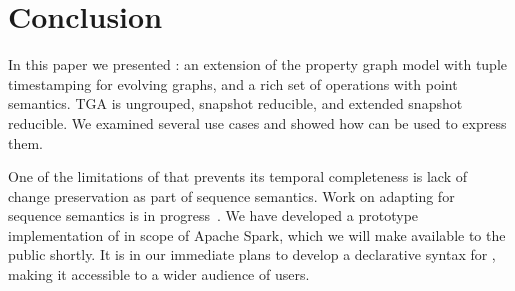 \section{Conclusion}
\label{sec:conc}

In this paper we presented \tga: an extension of the property graph
model with tuple timestamping for evolving graphs, and a rich set of
operations with point semantics.  TGA is ungrouped, snapshot
reducible, and extended snapshot reducible.  We examined several use
cases and showed how \tga can be used to express them.


One of the limitations of \tga that prevents its temporal completeness
is lack of change preservation as part of sequence semantics.  Work on
adapting \tga for sequence semantics is in
progress~\cite{MoffittEDBT17}.
%
We have developed a prototype implementation of \tga in scope of
Apache Spark, which we will make available to the public shortly.  It
is in our immediate plans to develop a declarative syntax for \tga,
making it accessible to a wider audience of users.
